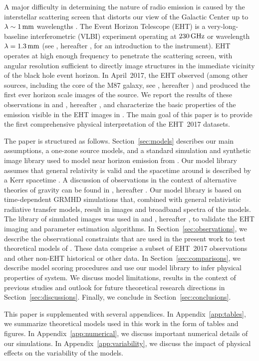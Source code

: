 A major difficulty in determining the nature of \sgra radio emission is caused by the interstellar scattering screen that distorts our view of the Galactic Center up to $\lambda \sim 1\,\mathrm{mm}$ wavelengths
\citep[see][and references therein]{2018arXiv180501242P, 2018ApJ...865..104J,2019ApJ...871...30I}.
The Event Horizon Telescope (EHT) is a very-long-baseline interferometric (VLBI) experiment operating at $230\,\mathrm{GHz}$ or wavelength $\lambda = 1.3\,\mathrm{mm}$ (see \citealt{M87PaperII}, hereafter , for an introduction to the instrument).
EHT operates at high enough frequency to penetrate the scattering screen, with angular resolution sufficient to directly image structures in the immediate vicinity of the black hole event horizon.
In April~2017, the EHT observed \sgra (among other sources, including the core of the M87 galaxy, see \citealt{M87PaperI}, hereafter ) and produced the first ever horizon scale images of the source.
We report the results of these observations in  and \citet{PaperIII}, hereafter , and characterize the basic properties of the emission visible in the EHT images in .
The main goal of this paper  is to provide the first comprehensive physical interpretation of the EHT~2017 \sgra datasets.

The paper is structured as follows.
Section~\ref{sec:models} describes our main assumptions, a one-zone source models, and a standard simulation and synthetic image library used to model near horizon emission from \sgra.
Our model library assumes that general relativity is valid and the spacetime around \sgra is described by a Kerr spacetime \citep{1963PhRvL..11..237K}.
A discussion of \sgra observations in the context of alternative theories of gravity can be found in  \citet{PaperVI}, hereafter .
Our model library is based on time-dependent GRMHD simulations that, combined with general relativistic radiative transfer models, result in images and broadband spectra of the models.
The library of simulated images was used in  and \citet{PaperIV}, hereafter , to validate the \sgra EHT imaging and parameter estimation algorithms.
In Section~\ref{sec:observations}, we describe the  observational constraints that are used in the present work to test theoretical models of \sgra.
These data comprise a subset of EHT~2017 observations and other non-EHT historical or other data.
In Section~\ref{sec:comparisons}, we describe model scoring procedures and use our model library to infer physical properties of \sgra system.
We discuss model limitations, results in the context of previous studies and outlook for future \sgra theoretical research directions in Section~\ref{sec:discussions}.
Finally, we conclude in Section~\ref{sec:conclusions}.

This paper is supplemented with several appendices.
In Appendix~\ref{app:tables},      we summarize theoretical models used in this work in the form of tables and figures.
In Appendix~\ref{app:numerical},   we discuss important numerical details of our simulations.
In Appendix~\ref{app:variability}, we discuss the impact of physical effects on the variability of the models.
